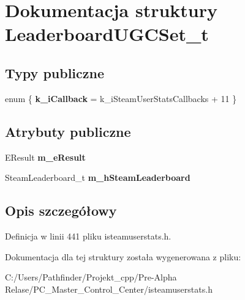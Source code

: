\hypertarget{struct_leaderboard_u_g_c_set__t}{}\section{Dokumentacja struktury Leaderboard\+U\+G\+C\+Set\+\_\+t}
\label{struct_leaderboard_u_g_c_set__t}
\subsection*{Typy publiczne}
\begin{DoxyCompactItemize}
\item 
\mbox{\label{struct_leaderboard_u_g_c_set__t_a03141f6e38292cb6c7d24361c870d8b8}} 
enum \{ {\bfseries k\+\_\+i\+Callback} = k\+\_\+i\+Steam\+User\+Stats\+Callbacks + 11
 \}
\end{DoxyCompactItemize}
\subsection*{Atrybuty publiczne}
\begin{DoxyCompactItemize}
\item 
\mbox{\label{struct_leaderboard_u_g_c_set__t_a6af1c684cb4b5bed5029e74ad1878245}} 
E\+Result {\bfseries m\+\_\+e\+Result}
\item 
\mbox{\label{struct_leaderboard_u_g_c_set__t_aa93d0b835359ee86f532b13c186e7abc}} 
Steam\+Leaderboard\+\_\+t {\bfseries m\+\_\+h\+Steam\+Leaderboard}
\end{DoxyCompactItemize}


\subsection{Opis szczegółowy}


Definicja w linii 441 pliku isteamuserstats.\+h.



Dokumentacja dla tej struktury została wygenerowana z pliku\+:\begin{DoxyCompactItemize}
\item 
C\+:/\+Users/\+Pathfinder/\+Projekt\+\_\+cpp/\+Pre-\/\+Alpha Relase/\+P\+C\+\_\+\+Master\+\_\+\+Control\+\_\+\+Center/isteamuserstats.\+h\end{DoxyCompactItemize}
